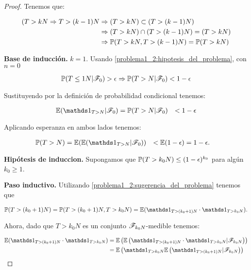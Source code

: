 \begin{proof}
	Tenemos que: 
	
	\begin{align}
		(T>kN \Rightarrow T>(k-1)N 	&\Rightarrow (T>kN) \subset (T>(k-1)N) \\ 
									&\Rightarrow (T>kN) \cap (T>(k-1)N) = (T>kN) \\ 
									&\Rightarrow \mathbb{P}(T>kN, T>(k-1)N) = \mathbb{P}(T>kN)	
	\end{align}\pn
		
	\textbf{Base de inducción.} $k=1$. Usando \eqref{problema1_2:hipotesis_del_problema}, con $n=0$ 
	
    \begin{align}
		\mathbb{P}(T\leq 1N | \mathscr{F}_0) > \epsilon\Rightarrow
		\mathbb{P}(T>N| \mathscr{F}_0) < 1 - \epsilon
	\end{align}\pn
    
	Sustituyendo por la definición de probabilidad condicional tenemos:

    \begin{align}
        \E(\indic_{T>N} | \F_0)	&= \mw(T>N| \F_0) 
                                &< 1 - \epsilon
    \end{align}\pn

	Aplicando esperanza en ambos lados tenemos:
    
    \begin{align} 
        \mw(T>N) 	&= 	\E(\E(\indic_{T>N} | \F_0)) 
                    &< 	\E(1 - \epsilon) 
                    &= 1 - \epsilon.
    \end{align}\pn
	
	\textbf{Hipótesis de induccion.} 
    Supongamos que $\mathbb{P}(T>k_0N)\leq(1 - \epsilon)^{k_0}$ para algún $k_0 \geq 1$.\pn
	
	\textbf{Paso inductivo.} 
	Utilizando \eqref{problema1_2:sugerencia_del_problema} tenemos que
    
    \begin{align}
        \mw(T>(k_0+1)N) = \mw(T>(k_0+1)N, T>k_0N) = \E(\indic_{T>(k_0+1)N} \cdot \indic_{T>k_0N}).
    \end{align}\pn
        
	Ahora, dado que $T>k_0N$ es un conjunto $\mathscr{F}_{k_0N}$-medible tenemos:
    
	\begin{align} 
		\E(\indic_{T>(k_0+1)N} \cdot \indic_{T>k_0N}) 	&=		\E\left(\E\left(\indic_{T>(k_0+1)N} \cdot \indic_{T>k_0N} | \F_{k_0N}\right)\right) \\ 
														&=		\E\left(\indic_{T>k_0N} \E\left(\indic_{T>(k_0+1)N}|\F_{k_0N}\right)\right) \label{problema1_2:resultado_preliminar}
	\end{align}\pn
    

\end{proof}
